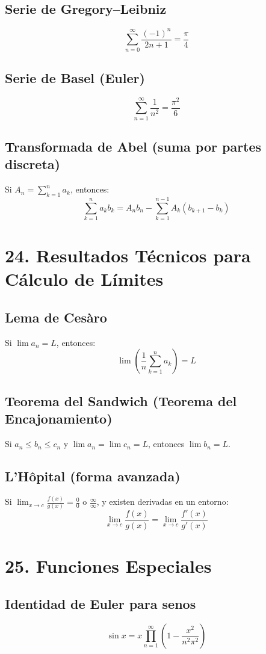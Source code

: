 \documentclass[12pt]{article}
\begin{document}
\subsection{Serie de Gregory–Leibniz}
\[
\sum_{n=0}^\infty \frac{(-1)^n}{2n+1} = \frac{\pi}{4}
\]

\subsection{Serie de Basel (Euler)}
\[
\sum_{n=1}^\infty \frac{1}{n^2} = \frac{\pi^2}{6}
\]

\subsection{Transformada de Abel (suma por partes discreta)}
Si \(A_n = \sum_{k=1}^n a_k\), entonces:
\[
\sum_{k=1}^n a_k b_k = A_n b_n - \sum_{k=1}^{n-1} A_k (b_{k+1} - b_k)
\]

\section{24. Resultados Técnicos para Cálculo de Límites}

\subsection{Lema de Cesàro}
Si \(\lim a_n = L\), entonces:
\[
\lim \left( \frac{1}{n} \sum_{k=1}^n a_k \right) = L
\]

\subsection{Teorema del Sandwich (Teorema del Encajonamiento)}
Si \(a_n \leq b_n \leq c_n\) y \(\lim a_n = \lim c_n = L\), entonces \(\lim b_n = L\).

\subsection{L'Hôpital (forma avanzada)}
Si \(\lim_{x \to c} \frac{f(x)}{g(x)} = \frac{0}{0}\) o \(\frac{\infty}{\infty}\), y existen derivadas en un entorno:
\[
\lim_{x \to c} \frac{f(x)}{g(x)} = \lim_{x \to c} \frac{f'(x)}{g'(x)}
\]

\section{25. Funciones Especiales}

\subsection{Identidad de Euler para senos}
\[
\sin x = x \prod_{n=1}^\infty \left(1 - \frac{x^2}{n^2 \pi^2} \right)
\]
\end{document}
